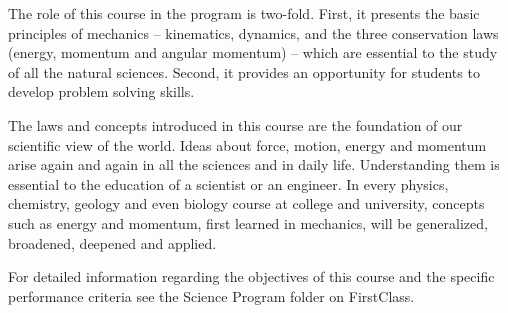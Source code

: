 {The role of this course in the program is two-fold. First, it presents the basic principles of mechanics -- kinematics, dynamics, and the three conservation laws (energy, momentum and angular momentum) -- which are essential to the study of all the natural sciences. Second, it provides an opportunity for students to develop problem solving skills.
\smallskip

The laws and concepts introduced in this course are the foundation of our scientific view of the world. Ideas about force, motion, energy and momentum arise again and again in all the sciences and in daily life. Understanding them is essential to the education of a scientist or an engineer. In every physics, chemistry, geology and even biology course at college and university, concepts such as energy and momentum, first learned in mechanics, will be generalized, broadened, deepened and applied.
\smallskip

For detailed information regarding the objectives of this course and the specific performance criteria see the Science Program folder on FirstClass.}
